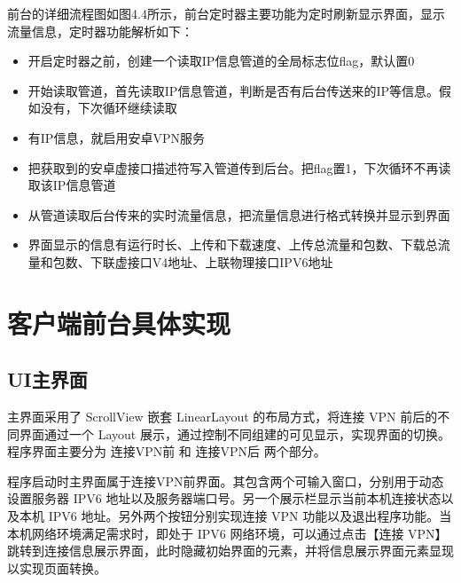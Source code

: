 前台的详细流程图如图4.4所示，前台定时器主要功能为定时刷新显示界面，显示流量信息，定时器功能解析如下：
\begin{itemize}
  \item 开启定时器之前，创建一个读取IP信息管道的全局标志位flag，默认置0
  \item 开始读取管道，首先读取IP信息管道，判断是否有后台传送来的IP等信息。假如没有，下次循环继续读取
  \item 有IP信息，就启用安卓VPN服务
  \item 把获取到的安卓虚接口描述符写入管道传到后台。把flag置1，下次循环不再读取该IP信息管道
  \item 从管道读取后台传来的实时流量信息，把流量信息进行格式转换并显示到界面
  \item 界面显示的信息有运行时长、上传和下载速度、上传总流量和包数、下载总流量和包数、下联虚接口V4地址、上联物理接口IPV6地址
\end{itemize}


\section{客户端前台具体实现}

\subsection{UI主界面}
主界面采用了 ScrollView 嵌套 LinearLayout 的布局方式，将连接 VPN 前后的不同界面通过一个 Layout 展示，通过控制不同组建的可见显示，实现界面的切换。程序界面主要分为 连接VPN前 和 连接VPN后 两个部分。

程序启动时主界面属于连接VPN前界面。其包含两个可输入窗口，分别用于动态设置服务器 IPV6 地址以及服务器端口号。另一个展示栏显示当前本机连接状态以及本机 IPV6 地址。另外两个按钮分别实现连接 VPN 功能以及退出程序功能。当本机网络环境满足需求时，即处于 IPV6 网络环境，可以通过点击【连接 VPN】跳转到连接信息展示界面，此时隐藏初始界面的元素，并将信息展示界面元素显现以实现页面转换。 

